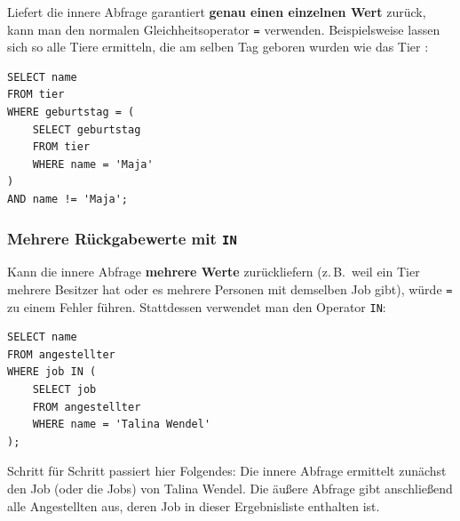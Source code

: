 Liefert die innere Abfrage garantiert \textbf{genau einen einzelnen Wert} zurück,
kann man den normalen Gleichheitsoperator \lstinline|=| verwenden.
Beispielsweise lassen sich so alle Tiere ermitteln, die am selben Tag geboren
wurden wie das Tier :

\begin{lstlisting}
SELECT name
FROM tier
WHERE geburtstag = (
    SELECT geburtstag
    FROM tier
    WHERE name = 'Maja'
)
AND name != 'Maja';
\end{lstlisting}

\subsubsection{Mehrere Rückgabewerte mit \texttt{IN}}

Kann die innere Abfrage \textbf{mehrere Werte} zurückliefern (z.\,B.\ weil ein Tier
mehrere Besitzer hat oder es mehrere Personen mit demselben Job gibt), würde
\lstinline|=| zu einem Fehler führen. Stattdessen verwendet man den Operator
\lstinline|IN|:

\begin{lstlisting}
SELECT name
FROM angestellter
WHERE job IN (
    SELECT job
    FROM angestellter
    WHERE name = 'Talina Wendel'
);
\end{lstlisting}

Schritt für Schritt passiert hier Folgendes: Die innere Abfrage ermittelt
zunächst den Job (oder die Jobs) von Talina Wendel. Die äußere Abfrage gibt
anschließend alle Angestellten aus, deren Job in dieser Ergebnisliste enthalten
ist.
